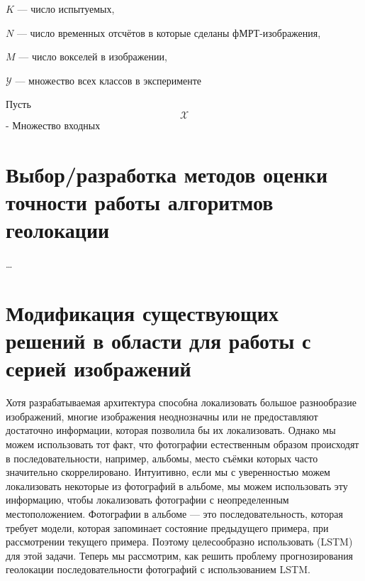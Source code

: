 \begin{compactitem}
	
	\item $K$ --- число испытуемых,
	\item $N$ --- число временных отсчётов в которые сделаны фМРТ-изображения,
	\item $M$ --- число вокселей в изображении,
	\item $\mathcal{Y}$ --- множество всех классов в эксперименте
	
\end{compactitem}
Пусть \[\mathcal{X}\] - Множество входных

\section{Выбор/разработка методов оценки точности работы алгоритмов геолокации}

\dots


\section{Модификация существующих решений в области для работы с серией изображений}

Хотя разрабатываемая архитектура способна локализовать большое разнообразие изображений, многие изображения неоднозначны или не предоставляют достаточно информации, которая позволила бы их локализовать.
Однако мы можем использовать тот факт, что фотографии естественным образом происходят в последовательности, например, альбомы, место съёмки которых часто значительно скоррелировано. Интуитивно, если мы с уверенностью можем локализовать
некоторые из фотографий в альбоме, мы можем использовать эту информацию,
чтобы локализовать фотографии с неопределенным местоположением. Фотографии в альбоме --- это последовательность,
которая требует модели, которая запоминает состояние предыдущего примера, 
при рассмотрении текущего примера. Поэтому целесообразно использовать
(LSTM) \cite{hochreiter1997long} для этой задачи.
Теперь мы рассмотрим, как решить проблему прогнозирования
геолокации последовательности фотографий с использованием LSTM.

